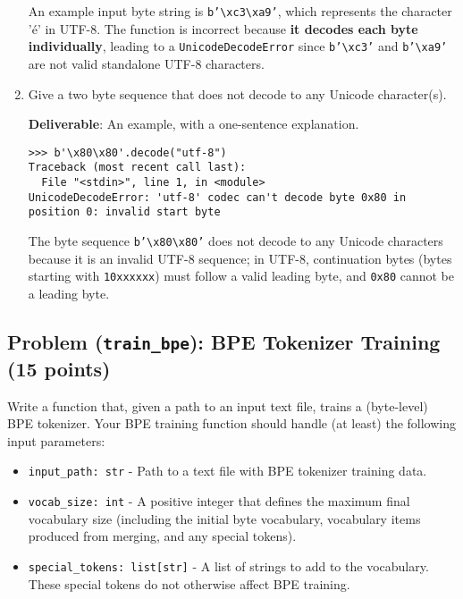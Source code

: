 \documentclass{article}
\newcounter{problem}
\newcommand{\problem}[2]{
    \stepcounter{problem}
    \subsection{Problem (\texttt{#1}): #2}
    \vspace{-1.5em} %
    \noindent
}
\begin{document}
\begin{enumerate}[label=(\alph*)]
    \begin{answer}
    An example input byte string is \texttt{b'\textbackslash xc3\textbackslash xa9'}, which represents the character 'é' in UTF-8. The function is incorrect because \textbf{it decodes each byte individually}, leading to a \texttt{UnicodeDecodeError} since \texttt{b'\textbackslash xc3'} and \texttt{b'\textbackslash xa9'} are not valid standalone UTF-8 characters.
    \end{answer}
    
    \item {Give a two byte sequence that does not decode to any Unicode character(s).}
    
    {\textbf{Deliverable}: An example, with a one-sentence explanation.}
    
    \begin{lstlisting}
>>> b'\x80\x80'.decode("utf-8") 
Traceback (most recent call last):
  File "<stdin>", line 1, in <module>
UnicodeDecodeError: 'utf-8' codec can't decode byte 0x80 in position 0: invalid start byte
    \end{lstlisting}

    \begin{answer}
    The byte sequence \texttt{b'\textbackslash x80\textbackslash x80'} does not decode to any Unicode characters because it is an invalid UTF-8 sequence; in UTF-8, continuation bytes (bytes starting with \texttt{10xxxxxx}) must follow a valid leading byte, and \texttt{0x80} cannot be a leading byte.
    \end{answer}
\end{enumerate}

\problem{train\_bpe}{BPE Tokenizer Training (15 points)}

Write a function that, given a path to an input text file, trains a (byte-level) BPE tokenizer. Your BPE training function should handle (at least) the following input parameters:

\begin{itemize}
    \item \lstinline{input_path: str} - Path to a text file with BPE tokenizer training data.
    \item \lstinline{vocab_size: int} - A positive integer that defines the maximum final vocabulary size (including the initial byte vocabulary, vocabulary items produced from merging, and any special tokens).
    \item \lstinline{special_tokens: list[str]} - A list of strings to add to the vocabulary. These special tokens do not otherwise affect BPE training.
\end{itemize}
\end{document}
